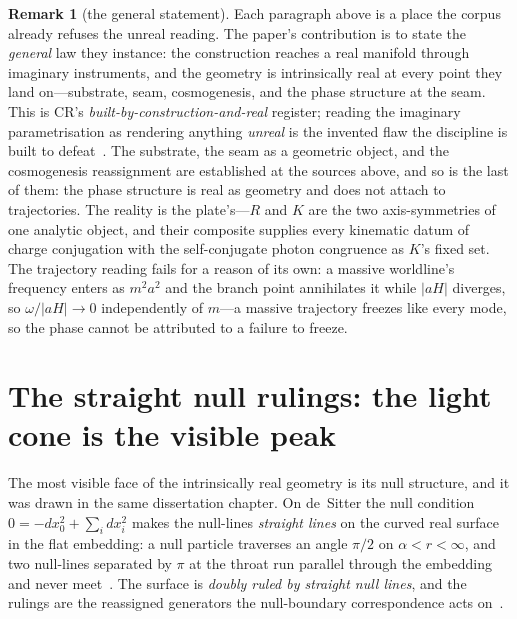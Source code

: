 \documentclass[11pt,a4paper]{article}
\theoremstyle{definition}
\newtheorem{remark}[theorem]{Remark}
\begin{document}
\begin{remark}[the general statement]
Each paragraph above is a place the corpus already refuses the unreal reading. The
paper's contribution is to state the \emph{general} law they instance: the
construction reaches a real manifold through imaginary instruments, and the
geometry is intrinsically real at every point they land on---substrate,
seam, cosmogenesis, and the phase structure at the seam. This is CR's \emph{built-by-construction-and-real}
register; reading the imaginary parametrisation as rendering anything
\emph{unreal} is the invented flaw the discipline is built to
defeat~\cite{JanzenShadowExistence}. The substrate, the seam as a geometric
object, and the cosmogenesis reassignment are established at the sources
above, and so is the last of them: the phase structure is real as geometry
and does not attach to trajectories. The reality is the plate's---$R$ and $K$
are the two axis-symmetries of one analytic object, and their composite
supplies every kinematic datum of charge conjugation with the self-conjugate
photon congruence as $K$'s fixed set. The trajectory reading fails for a
reason of its own: a massive worldline's frequency enters as $m^{2}a^{2}$ and
the branch point annihilates it while $\lvert aH\rvert$ diverges, so
$\omega/\lvert aH\rvert\to0$ independently of $m$---a massive trajectory
freezes like every mode, so the phase cannot be attributed to a failure to freeze.
\end{remark}

\section{The straight null rulings: the light cone is the visible peak}\label{sec:rulings}

The most visible face of the intrinsically real geometry is its null
structure, and it was drawn in the same dissertation chapter. On de~Sitter
the null condition $0=-dx_0^2+\sum_i dx_i^2$ makes the null-lines
\emph{straight lines} on the curved real surface in the flat embedding: a
null particle traverses an angle $\pi/2$ on $\alpha<r<\infty$, and two
null-lines separated by $\pi$ at the throat run parallel through the
embedding and never meet~\cite[Eqs.~following (null\_eom)]{JanzenThesis}.
The surface is \emph{doubly ruled by straight null lines}, and the rulings
are the reassigned generators the null-boundary correspondence acts
on~\cite{JanzenCRcosmology}.
\end{document}
